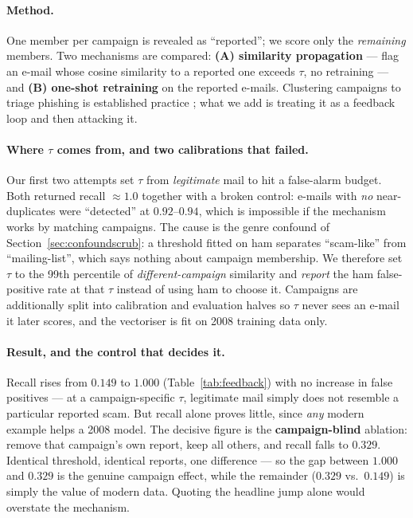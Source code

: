 \documentclass[11pt]{article}
\begin{document}
\paragraph{Method.} One member per campaign is revealed as ``reported''; we score only the
\emph{remaining} members. Two mechanisms are compared: \textbf{(A) similarity propagation} --- flag
an e-mail whose cosine similarity to a reported one exceeds $\tau$, no retraining --- and
\textbf{(B) one-shot retraining} on the reported e-mails. Clustering campaigns to triage phishing is
established practice \citep{althobaiti2023clustering}; what we add is treating it as a feedback loop
and then attacking it.

\paragraph{Where $\tau$ comes from, and two calibrations that failed.} Our first two attempts set
$\tau$ from \emph{legitimate} mail to hit a false-alarm budget. Both returned recall $\approx 1.0$
together with a broken control: e-mails with \emph{no} near-duplicates were ``detected'' at
$0.92$--$0.94$, which is impossible if the mechanism works by matching campaigns. The cause is the
genre confound of Section~\ref{sec:confoundscrub}: a threshold fitted on ham separates
``scam-like'' from ``mailing-list'', which says nothing about campaign membership. We therefore set
$\tau$ to the 99th percentile of \emph{different-campaign} similarity and \emph{report} the ham
false-positive rate at that $\tau$ instead of using ham to choose it. Campaigns are additionally
split into calibration and evaluation halves so $\tau$ never sees an e-mail it later scores, and the
vectoriser is fit on 2008 training data only.

\paragraph{Result, and the control that decides it.} Recall rises from $0.149$ to $1.000$
(Table~\ref{tab:feedback}) with no increase in false positives --- at a campaign-specific $\tau$,
legitimate mail simply does not resemble a particular reported scam. But recall alone proves little,
since \emph{any} modern example helps a 2008 model. The decisive figure is the
\textbf{campaign-blind} ablation: remove that campaign's own report, keep all others, and recall
falls to $0.329$. Identical threshold, identical reports, one difference --- so the gap between
$1.000$ and $0.329$ is the genuine campaign effect, while the remainder ($0.329$ vs.\ $0.149$) is
simply the value of modern data. Quoting the headline jump alone would overstate the mechanism.
\end{document}
